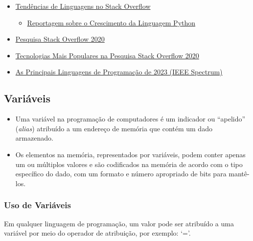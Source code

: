 \documentclass[12pt,a4paper]{article}
\providecommand{\tightlist}{%
      \setlength{\itemsep}{0pt}\setlength{\parskip}{0pt}}
\begin{document}
\begin{itemize}
\tightlist
\item
  \href{https://insights.stackoverflow.com/trends?tags=python\%2Cjava\%2Cjavascript}{Tendências
  de Linguagens no Stack Overflow}

  \begin{itemize}
  \tightlist
  \item
    \href{https://profdanielbrandao.wordpress.com/2019/03/01/o-incrivel-crescimento-da-linguagem-python/}{Reportagem
    sobre o Crescimento da Linguagem Python}
  \end{itemize}
\item
  \href{https://insights.stackoverflow.com/survey/2020}{Pesquisa Stack
  Overflow 2020}
\item
  \href{https://insights.stackoverflow.com/survey/2020\#most-popular-technologies}{Tecnologias
  Mais Populares na Pesquisa Stack Overflow 2020}
\item
  \href{https://spectrum.ieee.org/the-top-programming-languages-2023}{As
  Principais Linguagens de Programação de 2023 (IEEE Spectrum)}
\end{itemize}

    \hypertarget{variuxe1veis}{%
\subsection{Variáveis}\label{variuxe1veis}}

    \begin{itemize}
\tightlist
\item
  Uma variável na programação de computadores é um indicador ou
  ``apelido'' (\emph{alias}) atribuído a um endereço de memória que
  contém um dado armazenado.
\item
  Os elementos na memória, representados por variáveis, podem conter
  apenas um ou múltiplos valores e são codificados na memória de acordo
  com o tipo específico do dado, com um formato e número apropriado de
  bits para mantê-los.
\end{itemize}

    \hypertarget{uso-de-variuxe1veis}{%
\subsubsection{Uso de Variáveis}\label{uso-de-variuxe1veis}}

    Em qualquer linguagem de programação, um valor pode ser atribuído a uma
variável por meio do operador de atribuição, por exemplo: `='.
\end{document}
